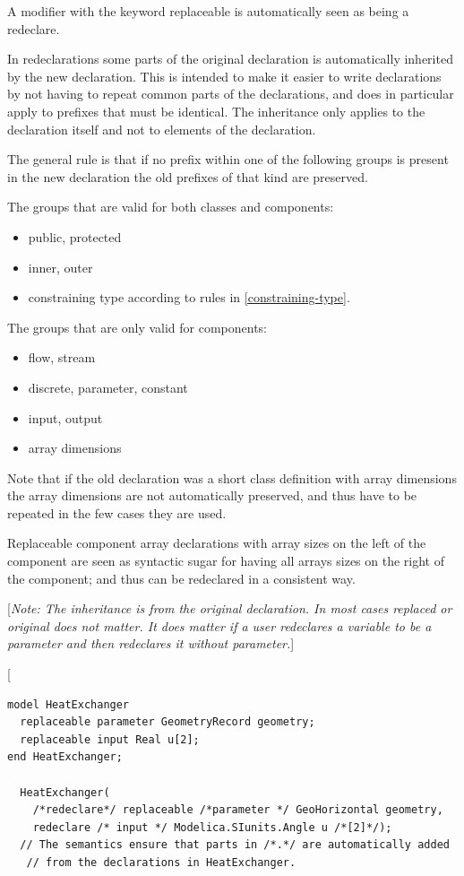 \documentclass[10pt,a4paper]{report}
\begin{document}
A modifier with the keyword replaceable is automatically seen as being a
redeclare.

In redeclarations some parts of the original declaration is
automatically inherited by the new declaration. This is intended to make
it easier to write declarations by not having to repeat common parts of
the declarations, and does in particular apply to prefixes that must be
identical. The inheritance only applies to the declaration itself and
not to elements of the declaration.

The general rule is that if no prefix within one of the following groups
is present in the new declaration the old prefixes of that kind are
preserved.

The groups that are valid for both classes and components:

\begin{itemize}
\item
  public, protected
\item
  inner, outer
\item
  constraining type according to rules in \ref{constraining-type}.
\end{itemize}

The groups that are only valid for components:

\begin{itemize}
\item
  flow, stream
\item
  discrete, parameter, constant
\item
  input, output
\item
  array dimensions
\end{itemize}

Note that if the old declaration was a short class definition with array
dimensions the array dimensions are not automatically preserved, and
thus have to be repeated in the few cases they are used.

Replaceable component array declarations with array sizes on the left of
the component are seen as syntactic sugar for having all arrays sizes on
the right of the component; and thus can be redeclared in a consistent
way.

{[}\emph{Note: The inheritance is from the original declaration. In most
cases replaced or original does not matter. It does matter if a user
redeclares a variable to be a parameter and then redeclares it without
parameter.}{]}

{[}
\begin{lstlisting}[language=modelica]
model HeatExchanger
  replaceable parameter GeometryRecord geometry;
  replaceable input Real u[2];
end HeatExchanger;

  HeatExchanger(
    /*redeclare*/ replaceable /*parameter */ GeoHorizontal geometry,
    redeclare /* input */ Modelica.SIunits.Angle u /*[2]*/);
  // The semantics ensure that parts in /*.*/ are automatically added
   // from the declarations in HeatExchanger.
\end{lstlisting}
\end{document}
